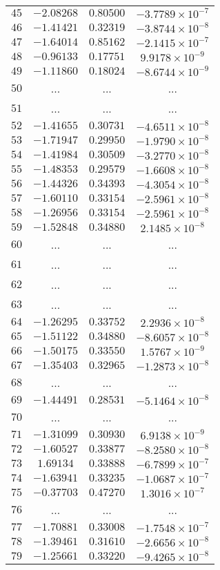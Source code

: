 \begin{center}
\begin{longtable}{lccc}
$45$ & $-2.08268$ & $ 0.80500$ & $-3.7789\times{}10^{-7}$ \\
$46$ & $-1.41421$ & $ 0.32319$ & $-3.8744\times{}10^{-8}$ \\
$47$ & $-1.64014$ & $ 0.85162$ & $-2.1415\times{}10^{-7}$ \\
$48$ & $-0.96133$ & $ 0.17751$ & $9.9178\times{}10^{-9}$ \\
$49$ & $-1.11860$ & $ 0.18024$ & $-8.6744\times{}10^{-9}$ \\
$50$ & ... & ... & ...\\
$51$ & ... & ... & ...\\
$52$ & $-1.41655$ & $ 0.30731$ & $-4.6511\times{}10^{-8}$ \\
$53$ & $-1.71947$ & $ 0.29950$ & $-1.9790\times{}10^{-8}$ \\
$54$ & $-1.41984$ & $ 0.30509$ & $-3.2770\times{}10^{-8}$ \\
$55$ & $-1.48353$ & $ 0.29579$ & $-1.6608\times{}10^{-8}$ \\
$56$ & $-1.44326$ & $ 0.34393$ & $-4.3054\times{}10^{-8}$ \\
$57$ & $-1.60110$ & $ 0.33154$ & $-2.5961\times{}10^{-8}$ \\
$58$ & $-1.26956$ & $ 0.33154$ & $-2.5961\times{}10^{-8}$ \\
$59$ & $-1.52848$ & $ 0.34880$ & $2.1485\times{}10^{-8}$ \\
$60$ & ... & ... & ...\\
$61$ & ... & ... & ...\\
$62$ & ... & ... & ...\\
$63$ & ... & ... & ...\\
$64$ & $-1.26295$ & $ 0.33752$ & $2.2936\times{}10^{-8}$ \\
$65$ & $-1.51122$ & $ 0.34880$ & $-8.6057\times{}10^{-8}$ \\
$66$ & $-1.50175$ & $ 0.33550$ & $1.5767\times{}10^{-9}$ \\
$67$ & $-1.35403$ & $ 0.32965$ & $-1.2873\times{}10^{-8}$ \\
$68$ & ... & ... & ...\\
$69$ & $-1.44491$ & $ 0.28531$ & $-5.1464\times{}10^{-8}$ \\
$70$ & ... & ... & ...\\
$71$ & $-1.31099$ & $ 0.30930$ & $6.9138\times{}10^{-9}$ \\
$72$ & $-1.60527$ & $ 0.33877$ & $-8.2580\times{}10^{-8}$ \\
$73$ & $ 1.69134$ & $ 0.33888$ & $-6.7899\times{}10^{-7}$ \\
$74$ & $-1.63941$ & $ 0.33235$ & $-1.0687\times{}10^{-7}$ \\
$75$ & $-0.37703$ & $ 0.47270$ & $1.3016\times{}10^{-7}$ \\
$76$ & ... & ... & ...\\
$77$ & $-1.70881$ & $ 0.33008$ & $-1.7548\times{}10^{-7}$ \\
$78$ & $-1.39461$ & $ 0.31610$ & $-2.6656\times{}10^{-8}$ \\
$79$ & $-1.25661$ & $ 0.33220$ & $-9.4265\times{}10^{-8}$ \\
  \end{longtable}
\end{center}
